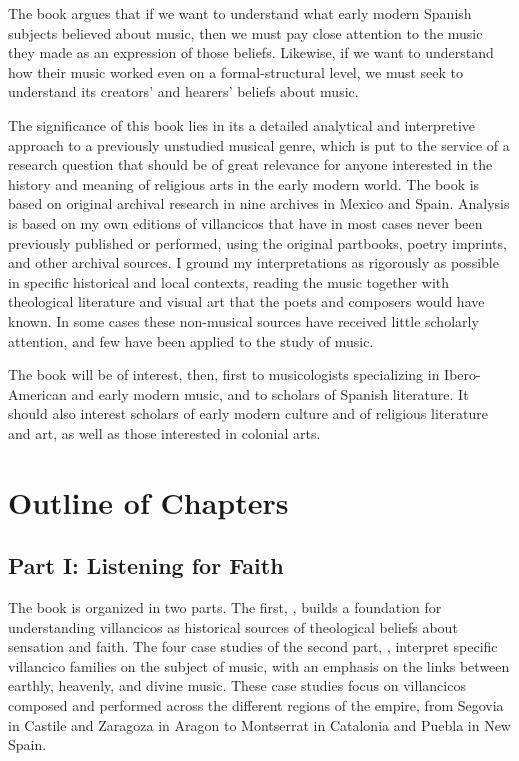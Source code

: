 \documentclass{vcbook-proposal}
\begin{document}
The book argues that if we want to understand what early modern Spanish 
subjects believed about music, then we must pay close attention to the music 
they made as an expression of those beliefs.
Likewise, if we want to understand how their music worked even on a 
formal-structural level, we must seek to understand its creators' and hearers' 
beliefs about music.

The significance of this book lies in its a detailed analytical and 
interpretive approach to a previously unstudied musical genre, which is put to 
the service of a research question that should be of great relevance for anyone 
interested in the history and meaning of religious arts in the early modern 
world.
The book is based on original archival research in nine archives in Mexico and 
Spain.
Analysis is based on my own editions of villancicos that have in most cases 
never been previously published or performed, using the original partbooks, 
poetry imprints, and other archival sources.
I ground my interpretations as rigorously as possible in specific historical 
and local contexts, reading the music together with theological literature and 
visual art that the poets and composers would have known.
In some cases these non-musical sources have received little scholarly 
attention, and few have been applied to the study of music.

The book will be of interest, then, first to musicologists specializing in 
Ibero-American and early modern music, and to scholars of Spanish literature.
It should also interest scholars of early modern culture and of religious 
literature and art, as well as those interested in colonial arts.


\section{Outline of Chapters}

\subsection{Part I: Listening for Faith}

The book is organized in two parts.
The first, , builds a foundation for 
understanding villancicos as historical sources of theological beliefs about 
sensation and faith.
The four case studies of the second part, , interpret specific villancico families on the subject of music, with an 
emphasis on the links between earthly, heavenly, and divine music.
These case studies focus on villancicos composed and performed across the
different regions of the empire, from Segovia in Castile and Zaragoza in Aragon
to Montserrat in Catalonia and Puebla in New Spain.
\end{document}
